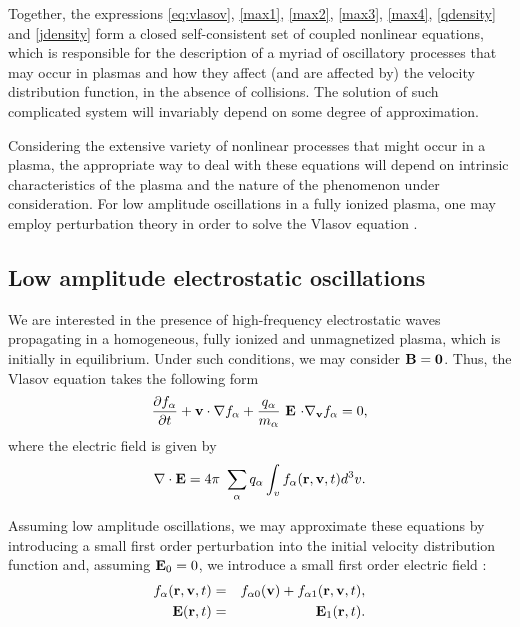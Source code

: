\documentclass[12pt,a4paper,ruledheader]{report}
\begin{document}
Together, the expressions \eqref{eq:vlasov}, \eqref{max1},
\eqref{max2}, \eqref{max3}, \eqref{max4}, \eqref{qdensity}
and \eqref{jdensity} form a closed self-consistent set
of coupled nonlinear equations, which is responsible for the
description of a myriad of oscillatory processes that may
occur in plasmas and how they affect (and are affected by) the
velocity distribution function, in the absence of collisions.
The solution of such complicated system  will invariably depend
on some degree of approximation.

Considering the extensive variety of nonlinear processes that
might occur in a plasma, the appropriate way to deal with these
equations will depend on intrinsic characteristics of the plasma
and the nature of the phenomenon under consideration. For low
amplitude oscillations in a fully ionized plasma, one may employ
perturbation theory in order to solve the Vlasov equation
\cite{klimo}.

\subsection{Low amplitude electrostatic oscillations}
We are interested in the presence of high-frequency electrostatic
waves propagating in a homogeneous, fully ionized and unmagnetized
plasma, which is initially in equilibrium. Under such conditions,
we may consider ${\bf B=0}$. Thus, the Vlasov equation takes the
following form
\begin{equation}
  \label{vlasov-elec}
  \frac{\partial f_\alpha}{\partial t}+{\bf v \cdot \nabla}f_\alpha
+\frac{q_{\alpha}}{m_\alpha}\ {\bf E}\ {\bf\cdot \nabla_v}f_\alpha=0,
\end{equation}
where the electric field is given by
\begin{equation}
{\bf \nabla \cdot E}  = 4\pi\ \sum_\alpha q_\alpha 
\int_v  f_\alpha({\bf r},{\bf v},t) d^3v.
\label{leidegauss}
\end{equation}

Assuming low amplitude oscillations, we may approximate these equations
by introducing a small first order perturbation into the initial velocity
distribution function and, assuming ${\bf E}_0=0$, we introduce a small
first order electric field :
\begin{eqnarray}
  \label{fpert}
  f_{\alpha}({\bf r}, {\bf v},t)&=&f_{\alpha0}({\bf v})
	    +f_{\alpha1}({\bf r}, {\bf v},t),\\
  {\bf E}({\bf r},t)&=&{\bf E}_1({\bf r},t).
\label{Epert}
\end{eqnarray}
\end{document}
